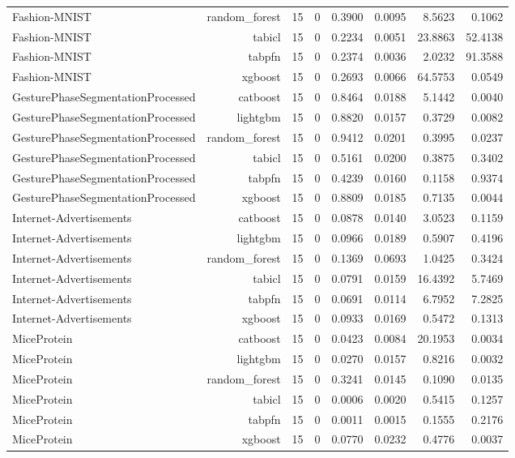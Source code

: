 \begin{table}[htbp]
\begin{tabular}{lrrrrrrr}
Fashion-MNIST & random\_forest & 15 & 0 & 0.3900 & 0.0095 & 8.5623 & 0.1062 \\
Fashion-MNIST & tabicl & 15 & 0 & 0.2234 & 0.0051 & 23.8863 & 52.4138 \\
Fashion-MNIST & tabpfn & 15 & 0 & 0.2374 & 0.0036 & 2.0232 & 91.3588 \\
Fashion-MNIST & xgboost & 15 & 0 & 0.2693 & 0.0066 & 64.5753 & 0.0549 \\
GesturePhaseSegmentationProcessed & catboost & 15 & 0 & 0.8464 & 0.0188 & 5.1442 & 0.0040 \\
GesturePhaseSegmentationProcessed & lightgbm & 15 & 0 & 0.8820 & 0.0157 & 0.3729 & 0.0082 \\
GesturePhaseSegmentationProcessed & random\_forest & 15 & 0 & 0.9412 & 0.0201 & 0.3995 & 0.0237 \\
GesturePhaseSegmentationProcessed & tabicl & 15 & 0 & 0.5161 & 0.0200 & 0.3875 & 0.3402 \\
GesturePhaseSegmentationProcessed & tabpfn & 15 & 0 & 0.4239 & 0.0160 & 0.1158 & 0.9374 \\
GesturePhaseSegmentationProcessed & xgboost & 15 & 0 & 0.8809 & 0.0185 & 0.7135 & 0.0044 \\
Internet-Advertisements & catboost & 15 & 0 & 0.0878 & 0.0140 & 3.0523 & 0.1159 \\
Internet-Advertisements & lightgbm & 15 & 0 & 0.0966 & 0.0189 & 0.5907 & 0.4196 \\
Internet-Advertisements & random\_forest & 15 & 0 & 0.1369 & 0.0693 & 1.0425 & 0.3424 \\
Internet-Advertisements & tabicl & 15 & 0 & 0.0791 & 0.0159 & 16.4392 & 5.7469 \\
Internet-Advertisements & tabpfn & 15 & 0 & 0.0691 & 0.0114 & 6.7952 & 7.2825 \\
Internet-Advertisements & xgboost & 15 & 0 & 0.0933 & 0.0169 & 0.5472 & 0.1313 \\
MiceProtein & catboost & 15 & 0 & 0.0423 & 0.0084 & 20.1953 & 0.0034 \\
MiceProtein & lightgbm & 15 & 0 & 0.0270 & 0.0157 & 0.8216 & 0.0032 \\
MiceProtein & random\_forest & 15 & 0 & 0.3241 & 0.0145 & 0.1090 & 0.0135 \\
MiceProtein & tabicl & 15 & 0 & 0.0006 & 0.0020 & 0.5415 & 0.1257 \\
MiceProtein & tabpfn & 15 & 0 & 0.0011 & 0.0015 & 0.1555 & 0.2176 \\
MiceProtein & xgboost & 15 & 0 & 0.0770 & 0.0232 & 0.4776 & 0.0037 \\

\end{tabular}
\end{table}

